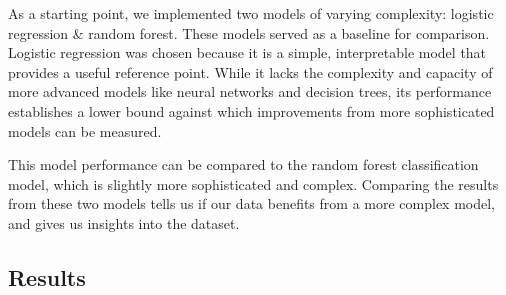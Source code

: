 \documentclass[final]{article}
\begin{document}
As a starting point, we implemented two models of varying complexity: logistic regression & random forest. These models served as a baseline for comparison. Logistic regression was chosen because it is a simple, interpretable model that provides a useful reference point. While it lacks the complexity and capacity of more advanced models like neural networks and decision trees, its performance establishes a lower bound against which improvements from more sophisticated models can be measured. 

This model performance can be compared to the random forest classification model, which is slightly more sophisticated and complex. Comparing the results from these two models tells us if our data benefits from a more complex model, and gives us insights into the dataset.

\subsection{Results}
\end{document}
